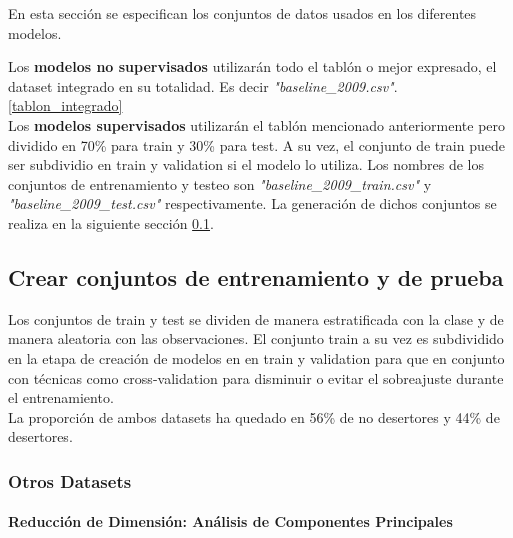 
En esta sección se especifican los conjuntos de datos usados en los diferentes modelos.

Los \textbf{modelos no supervisados} utilizarán todo el tablón o mejor expresado, el dataset integrado en su totalidad. Es decir \textit{"baseline\_2009.csv"}. \ref{tablon_integrado} \\

Los \textbf{modelos supervisados} utilizarán el tablón mencionado anteriormente pero dividido en 70\% para train y 30\% para test. A su vez, el conjunto de train puede ser subdividio en train y validation si el modelo lo utiliza.
Los nombres de los conjuntos de entrenamiento y testeo son \textit{"baseline\_2009\_train.csv"} y \textit{"baseline\_2009\_test.csv"} respectivamente.
La generación de dichos conjuntos se realiza en la siguiente sección \ref{dataset_train_test}.

\subsection{Crear conjuntos de entrenamiento y de prueba}\label{dataset_train_test}

Los conjuntos de train y test se dividen de manera estratificada con la clase y de manera aleatoria con las observaciones. El conjunto train a su vez es subdividido en la etapa de creación de modelos en en train y validation para que en conjunto con técnicas como cross-validation para disminuir o evitar el sobreajuste durante el entrenamiento.\\

La proporción de ambos datasets ha quedado en 56\% de no desertores y 44\% de desertores.



\subsubsection{Otros Datasets}

\paragraph{Reducción de Dimensión: Análisis de Componentes Principales}\label{anuxe1lisis-de-componentes-principales}

